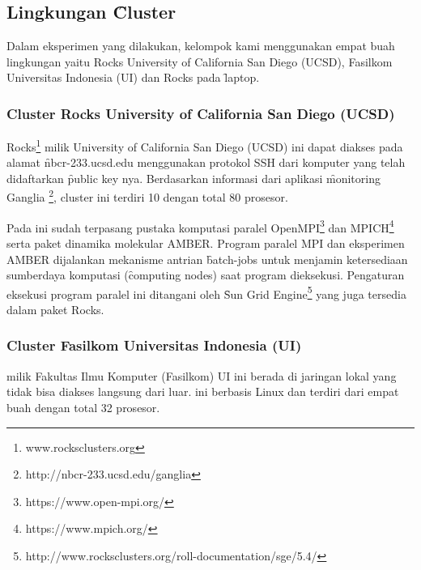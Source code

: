 \chapter{\lingkungan}

\section{Lingkungan \f{Cluster}}

Dalam eksperimen yang dilakukan, kelompok kami menggunakan empat buah lingkungan yaitu \cluster Rocks University of California San Diego (UCSD), \cluster Fasilkom Universitas Indonesia (UI) dan \cluster Rocks pada \f{laptop}.

\subsection{Cluster Rocks University of California San Diego (UCSD)}
\Cluster Rocks\footnote{www.rocksclusters.org} milik University of California San Diego (UCSD) ini dapat diakses pada alamat \f{nbcr-233.ucsd.edu} menggunakan protokol SSH dari komputer yang telah didaftarkan \f{public key} nya. Berdasarkan informasi dari aplikasi \f{monitoring} Ganglia \footnote{http://nbcr-233.ucsd.edu/ganglia}, cluster ini terdiri 10 \nodes dengan total 80 prosesor. 

Pada \cluster ini sudah terpasang pustaka komputasi paralel OpenMPI\footnote{https://www.open-mpi.org/} dan MPICH\footnote{https://www.mpich.org/} serta paket dinamika molekular AMBER. Program paralel MPI dan eksperimen AMBER dijalankan mekanisme antrian \f{batch-jobs} untuk menjamin ketersediaan sumberdaya komputasi (\f{computing nodes}) saat program dieksekusi. Pengaturan eksekusi program paralel ini ditangani oleh \f{Sun Grid Engine}\footnote{http://www.rocksclusters.org/roll-documentation/sge/5.4/} yang juga tersedia dalam paket Rocks.


\subsection{Cluster Fasilkom Universitas Indonesia (UI)}
\Cluster milik Fakultas Ilmu Komputer (Fasilkom) UI ini berada di jaringan lokal yang tidak bisa diakses langsung dari luar. \Cluster ini berbasis Linux dan terdiri dari empat buah \nodes dengan total 32 prosesor. 

